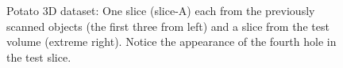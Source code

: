 \documentclass[journal]{IEEEtran}
\begin{document}
\begin{figure}[!h]
\begin{subfigure}[b]{0.24\linewidth}
\captionsetup{labelformat=empty}
        \caption{}
     \end{subfigure}
    \begin{subfigure}[b]{0.235\linewidth}
\captionsetup{labelformat=empty}
\caption{}
\label{fig:potato3D_test}
     \end{subfigure}
      \caption{Potato 3D dataset: One slice (slice-A) each from the previously scanned objects (the first three from left) and a slice from the test 
        volume (extreme right). Notice the appearance of the fourth
        hole in the test slice. }
\label{fig:object-prior_test_potato_A}
\end{figure}
\end{document}
